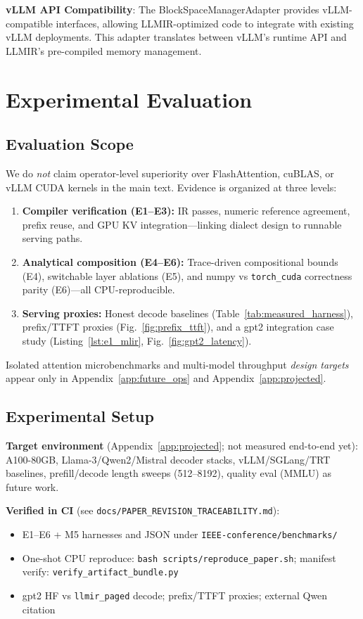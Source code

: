 \documentclass[conference]{IEEEtran}
\begin{document}
\textbf{vLLM API Compatibility}: The BlockSpaceManagerAdapter provides vLLM-compatible interfaces, allowing LLMIR-optimized code to integrate with existing vLLM deployments. This adapter translates between vLLM's runtime API and LLMIR's pre-compiled memory management.

\section{Experimental Evaluation}

\subsection{Evaluation Scope}

We do \emph{not} claim operator-level superiority over FlashAttention, cuBLAS, or vLLM CUDA kernels in the main text. Evidence is organized at three levels:
\begin{enumerate}
    \item \textbf{Compiler verification (E1--E3):} IR passes, numeric reference agreement, prefix reuse, and GPU KV integration---linking dialect design to runnable serving paths.
    \item \textbf{Analytical composition (E4--E6):} Trace-driven compositional bounds (E4), switchable layer ablations (E5), and numpy vs \texttt{torch\_cuda} correctness parity (E6)---all CPU-reproducible.
    \item \textbf{Serving proxies:} Honest decode baselines (Table~\ref{tab:measured_harness}), prefix/TTFT proxies (Fig.~\ref{fig:prefix_ttft}), and a gpt2 integration case study (Listing~\ref{lst:e1_mlir}, Fig.~\ref{fig:gpt2_latency}).
\end{enumerate}
Isolated attention microbenchmarks and multi-model throughput \emph{design targets} appear only in Appendix~\ref{app:future_ops} and Appendix~\ref{app:projected}.

\subsection{Experimental Setup}

\textbf{Target environment} (Appendix~\ref{app:projected}; not measured end-to-end yet): A100-80GB, Llama-3/Qwen2/Mistral decoder stacks, vLLM/SGLang/TRT baselines, prefill/decode length sweeps (512--8192), quality eval (MMLU) as future work.

\textbf{Verified in CI} (see \texttt{docs/PAPER\_REVISION\_TRACEABILITY.md}):
\begin{itemize}
    \item E1--E6 + M5 harnesses and JSON under \texttt{IEEE-conference/benchmarks/}
    \item One-shot CPU reproduce: \texttt{bash scripts/reproduce\_paper.sh}; manifest verify: \texttt{verify\_artifact\_bundle.py}
    \item gpt2 HF vs \texttt{llmir\_paged} decode; prefix/TTFT proxies; external Qwen citation
\end{itemize}
\end{document}
